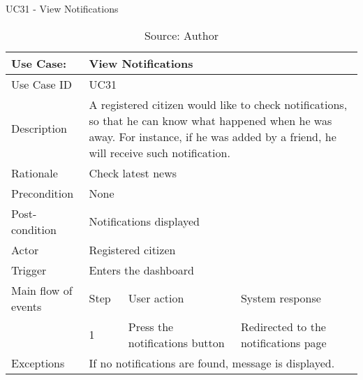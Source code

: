 \begin{table}[h]
\centering
\caption{UC31 - View Notifications}
\label{uc:31}
\begin{tabular}{|p{3cm}|p{1cm}|p{5cm}|p{5cm}|}
\hline
Use Case:       & \multicolumn{3}{p{11cm}|}{View Notifications} \\ \hline
Use Case ID     & \multicolumn{3}{p{11cm}|}{UC31} \\ \hline
Description     & \multicolumn{3}{p{11cm}|}{A registered citizen would like to check notifications, so that he can know what happened when he was away. For instance, if he was added by a friend, he will receive such notification.} \\ \hline
Rationale       & \multicolumn{3}{p{11cm}|}{Check latest news} \\ \hline
Precondition    & \multicolumn{3}{p{11cm}|}{None} \\ \hline
Post-condition  & \multicolumn{3}{p{11cm}|}{Notifications displayed} \\ \hline
Actor           & \multicolumn{3}{p{11cm}|}{Registered citizen} \\ \hline
Trigger         & \multicolumn{3}{p{11cm}|}{Enters the dashboard} \\ \hline
Main flow of events & Step  & User action & System response \\ \hline
                    & 1     & Press the notifications button & Redirected to the notifications page \\ \hline
Exceptions      & \multicolumn{3}{p{11cm}|}{If no notifications are found, message is displayed.} \\ \hline
\end{tabular}
\caption*{Source: Author}
\end{table}

